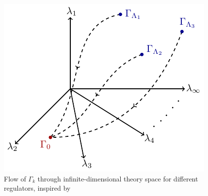 \blindtext

\begin{figure}[H]
\centering
\includegraphics{figs/TikZ/regulator_dependence}
\caption[Flow of $\Gamma_k$ through infinite-dimensional theory space for different regulators]{Flow of $\Gamma_k$ through infinite-dimensional theory space for different regulators, inspired by \cite{Riebesell2017}}	
\end{figure}